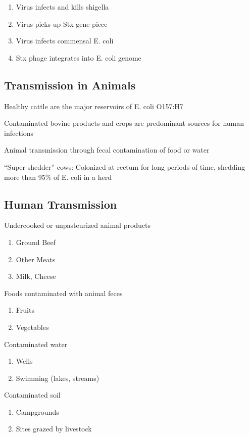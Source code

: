 \documentclass{notes}
\begin{document}
\begin{enumerate}
    \item Virus infects and kills shigella
    \item Virus picks up Stx gene piece
    \item Virus infects commensal E. coli
    \item Stx phage integrates into E. coli genome
\end{enumerate}

\subsection*{Transmission in Animals}
Healthy cattle are the major reservoirs of E. coli O157:H7

Contaminated bovine products and crops are predominant sources for human infections

Animal transmission through fecal contamination of food or water

``Super-shedder'' cows: Colonized at rectum for long periods of time, shedding more than 95\% of E. coli in a herd

\subsection*{Human Transmission}

Undercooked or unpasteurized animal products
\begin{enumerate}
    \item Ground Beef
    \item Other Meats
    \item Milk, Cheese
\end{enumerate}

Foods contaminated with animal feces
\begin{enumerate}
    \item Fruits
    \item Vegetables
\end{enumerate}

Contaminated water
\begin{enumerate}
    \item Wells
    \item Swimming (lakes, streams)
\end{enumerate}

Contaminated soil
\begin{enumerate}
    \item Campgrounds
    \item Sites grazed by livestock
\end{enumerate}
\end{document}

